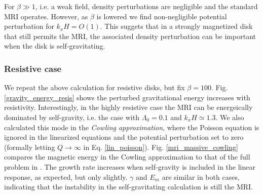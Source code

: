For $\beta\gg 1$, i.e. a weak field, density perturbations are
negligible and the standard MRI operates. However, as $\beta$ is
lowered we find non-negligible potential perturbation for
$k_xH=O(1)$. This suggets that in a strongly magnetized disk that
still permits the MRI, the associated density perturbation can be
important when the disk is self-gravitating. 

  
 


\subsubsection{Resistive case}
We repeat the above calculation for resistive disks, but fix
$\beta=100$. Fig. \ref{gravity_energy_resis} shows the 
perturbed gravitational energy increases with   
resistivity. Interestingly, in the highly resistive case
the MRI can be energeically dominated by self-gravity, i.e. the case
with $\Lambda_0=0.1$ and $k_xH\simeq1.3$. We also calculated this mode
in the \emph{Cowling  
  approximation}, where the Poisson equation is ignored in the 
linearized equations and the potential perturbation set to zero  
(formally letting $Q\to\infty$ in Eq. \ref{lin_poisson}).
Fig. \ref{mri_massive_cowling} compares the magnetic energy in the
Cowling approximation to that of 
the full problem in . The growth rate increases when self-gravity is
included in the linear response, as expected, but only
slightly. $\gamma$ and $E_m$ are similar in both cases, indicating
that the instability in the self-gravitating calculation is 
still the MRI.   


